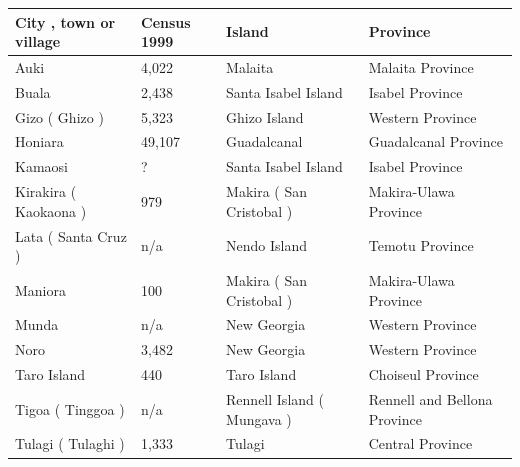 \documentclass{article}
\begin{document}
\begin{tabular}{llll}
\toprule
City , town or village & Census 1999 & Island & Province \\
\midrule
Auki & 4,022 & Malaita & Malaita Province \\
Buala & 2,438 & Santa Isabel Island & Isabel Province \\
Gizo ( Ghizo ) & 5,323 & Ghizo Island & Western Province \\
Honiara & 49,107 & Guadalcanal & Guadalcanal Province \\
Kamaosi & ? & Santa Isabel Island & Isabel Province \\
Kirakira ( Kaokaona ) & 979 & Makira ( San Cristobal ) & Makira-Ulawa Province \\
Lata ( Santa Cruz ) & n/a & Nendo Island & Temotu Province \\
Maniora & 100 & Makira ( San Cristobal ) & Makira-Ulawa Province \\
Munda & n/a & New Georgia & Western Province \\
Noro & 3,482 & New Georgia & Western Province \\
Taro Island & 440 & Taro Island & Choiseul Province \\
Tigoa ( Tinggoa ) & n/a & Rennell Island ( Mungava ) & Rennell and Bellona Province \\
Tulagi ( Tulaghi ) & 1,333 & Tulagi & Central Province \\
\bottomrule
\end{tabular}
\end{document}
